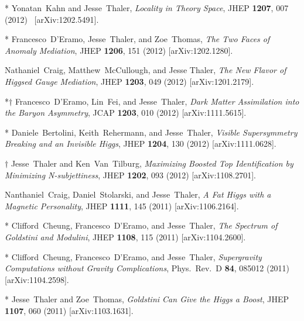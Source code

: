 \documentclass[11pt]{article}
\renewcommand{\bibitem}[1]{\item}
\begin{document}
\begin{list}{[]\addtocounter{jessecount}{-1}}{\leftmargin=3em \itemsep=4pt}
\bibitem{Kahn:2012as} 
  * Yonatan~Kahn and Jesse~Thaler,
  \emph{Locality in Theory Space},
  JHEP {\bf 1207}, 007 (2012) \linebreak\ [arXiv:1202.5491].

\bibitem{D'Eramo:2012qd} 
  * Francesco~D'Eramo, Jesse~Thaler, and Zoe~Thomas,
  \emph{The Two Faces of Anomaly Mediation},
  JHEP {\bf 1206}, 151 (2012)
  [arXiv:1202.1280].

\bibitem{Craig:2012yd} 
  Nathaniel~Craig, Matthew~McCullough, and Jesse Thaler,
  \emph{The New Flavor of Higgsed Gauge Mediation},
  JHEP {\bf 1203}, 049 (2012)
  [arXiv:1201.2179].
 

\bibitem{D'Eramo:2011ec}
  *$\dagger$ Francesco~D'Eramo, Lin~Fei, and Jesse~Thaler,
  \emph{Dark Matter Assimilation into the Baryon Asymmetry},
  JCAP {\bf 1203}, 010 (2012)
  [arXiv:1111.5615].

\bibitem{Bertolini:2011tw}
  * Daniele~Bertolini, Keith~Rehermann, and Jesse~Thaler,
  \emph{Visible Supersymmetry Breaking and an Invisible Higgs},
  JHEP {\bf 1204}, 130 (2012)
  [arXiv:1111.0628].

\bibitem{Thaler:2011gf}
  $\dagger$ Jesse~Thaler and Ken~Van~Tilburg,
  \emph{Maximizing Boosted Top Identification by Minimizing N-subjettiness},
  JHEP {\bf 1202}, 093 (2012)
  [arXiv:1108.2701].
  
\bibitem{Craig:2011ev}
  Nanthaniel~Craig, Daniel~Stolarski, and Jesse~Thaler,
  \emph{A Fat Higgs with a Magnetic Personality},
  JHEP {\bf 1111}, 145 (2011)
  [arXiv:1106.2164].

\bibitem{Cheung:2011jq}
  * Clifford~Cheung, Francesco~D'Eramo, and Jesse~Thaler,
  \emph{The Spectrum of Goldstini and Modulini},
  JHEP {\bf 1108}, 115 (2011)
  [arXiv:1104.2600].


\bibitem{Cheung:2011jp}
  * Clifford~Cheung, Francesco~D'Eramo, and Jesse~Thaler,
  \emph{Supergravity Computations without Gravity Complications},
  Phys.\ Rev.\  D {\bf 84}, 085012 (2011)
  [arXiv:1104.2598].
  
\bibitem{Thaler:2011me}
  * Jesse~Thaler and Zoe~Thomas,
  \emph{Goldstini Can Give the Higgs a Boost},
  JHEP {\bf 1107}, 060 (2011)
  [arXiv:1103.1631].
 

\end{list}
\end{document}
